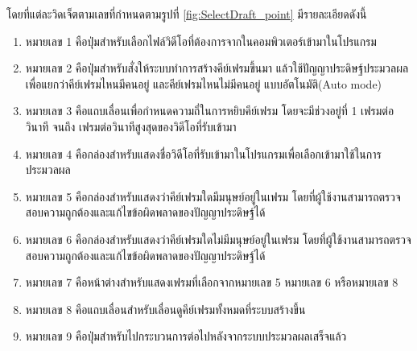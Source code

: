 โดยที่แต่ละวิดเจ็ตตามเลขที่กำหนดตามรูปที่ \ref{fig:SelectDraft_point} มีรายละเอียดดังนี้
\begin{enumerate}
	\setlength\itemsep{-0.25em}
	\item หมายเลข 1 คือปุ่มสำหรับเลือกไฟล์วิดีโอที่ต้องการจากในคอมพิวเตอร์เข้ามาในโปรแกรม
    \item หมายเลข 2 คือปุ่มสำหรับสั่งให้ระบบทำการสร้างคีย์เฟรมขึ้นมา 
    แล้วใช้ปัญญาประดิษฐ์ประมวลผลเพื่อแยกว่าคีย์เฟรมไหนมีคนอยู่ และคีย์เฟรมไหนไม่มีคนอยู่
    แบบอัตโนมัติ(Auto mode)
    \item หมายเลข 3 คือแถบเลื่อนเพื่อกำหนดความถี่ในการหยิบคีย์เฟรม โดยจะมีช่วงอยู่ที่ 1 
    เฟรมต่อวินาที จนถึง เฟรมต่อวินาทีสูงสุดของวิดีโอที่รับเข้ามา
	\item หมายเลข 4 คือกล่องสำหรับแสดงชื่อวิดีโอที่รับเข้ามาในโปรแกรมเพื่อเลือกเข้ามาใช้ในการประมวลผล
	\item หมายเลข 5 คือกล่องสำหรับแสดงว่าคีย์เฟรมใดมีมนุษย์อยู่ในเฟรม โดยที่ผู้ใช้งานสามารถตรวจสอบความถูกต้องและแก้ไขข้อผิดพลาดของปัญญาประดิษฐ์ได้
	\item หมายเลข 6 คือกล่องสำหรับแสดงว่าคีย์เฟรมใดไม่มีมนุษย์อยู่ในเฟรม โดยที่ผู้ใช้งานสามารถตรวจสอบความถูกต้องและแก้ไขข้อผิดพลาดของปัญญาประดิษฐ์ได้
	\item หมายเลข 7 คือหน้าต่างสำหรับแสดงเฟรมที่เลือกจากหมายเลข 5 หมายเลข 6 หรือหมายเลข 8
	\item หมายเลข 8 คือแถบเลื่อนสำหรับเลื่อนดูคีย์เฟรมทั้งหมดที่ระบบสร้างขึ้น
	\item หมายเลข 9 คือปุ่มสำหรับไปกระบวนการต่อไปหลังจากระบบประมวลผลเสร็จแล้ว
\end{enumerate}
\clearpage

